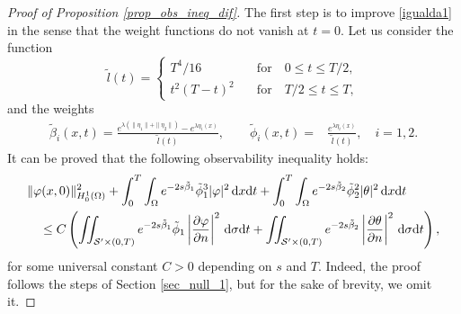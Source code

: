 \documentclass{dcds-bOF}
\theoremstyle{definition}
\def\dx{\,\textnormal{d}x}
\def\dt{\textnormal{d}t}
\def\d{\,\textnormal{d}}
\begin{document}
\begin{proof}[Proof of Proposition \ref{prop_obs_ineq_dif}]
 The first step is to improve \eqref{igualda1} in the sense that the weight functions do not vanish at $t=0$. Let us consider the function
 \begin{equation*}
 \widetilde{l}(t)=
 \begin{cases}
 T^4/16 \quad &\text{for}\quad 0\leq t\leq T/2, \\
 t^2(T-t)^2 \quad &\text{for}\quad T/2\leq t\leq T,
 \end{cases}
 \end{equation*}
 and the weights
 \begin{equation*}
\begin{split}
\tilde{\beta}_i(x,t)=\frac{e^{\lambda(\|\eta_1\|+\|\eta_2\|)}-e^{\lambda \eta_i(x)}}{\widetilde{l}(t)}, \qquad \tilde{\phi}_i(x,t)=&\frac{e^{\lambda\eta_i(x)}}{\widetilde{l}(t)}, \quad i=1,2.
\end{split}\end{equation*}
It can be proved that the following observability inequality holds:
\begin{equation}
\label{aux7}
\begin{split}
&\|\varphi(x,0)\|_{H_0^1(\Omega)}^2+\int_0^{T}\int_{\Omega}e^{-2s\tilde \beta_1}\tilde \phi_1^{3}|\varphi|^2\dx\dt+\int_0^{T}\int_{\Omega}e^{-2s\tilde \beta_2}\tilde \phi_2^{2}|\theta|^2\dx\dt\\
&\quad \leq C\left(\iint_{\mathcal S^\prime\times(0,T)}e^{-2s\tilde \beta_1}\tilde \phi_1\left|\frac{\partial \varphi}{\partial n}\right|^2\d\sigma\dt+\iint_{\mathcal S^{\prime}\times(0,T)}e^{-2s\tilde \beta_2}\left|\frac{\partial \theta}{\partial n}\right|^2\d\sigma\dt\right),
\end{split}
\end{equation}
 for some universal constant $C>0$ depending on $s$ and $T$. Indeed, the proof follows the steps of Section \ref{sec_null_1}, but for the sake of brevity, we omit it.


\end{proof}
\end{document}
